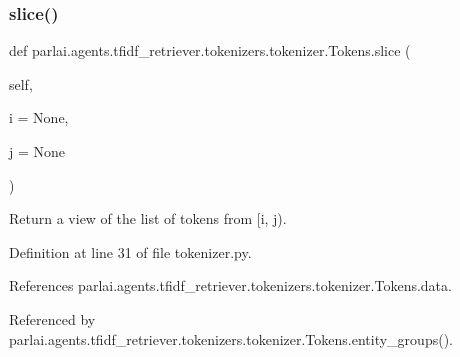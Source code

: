 \mbox{\label{classparlai_1_1agents_1_1tfidf__retriever_1_1tokenizers_1_1tokenizer_1_1Tokens_a8e68a443796116164126c7216f5963d3}} 
\subsubsection{\texorpdfstring{slice()}{slice()}}
{\footnotesize\ttfamily def parlai.\+agents.\+tfidf\+\_\+retriever.\+tokenizers.\+tokenizer.\+Tokens.\+slice (\begin{DoxyParamCaption}\item[{}]{self,  }\item[{}]{i = {\ttfamily None},  }\item[{}]{j = {\ttfamily None} }\end{DoxyParamCaption})}

\begin{DoxyVerb}Return a view of the list of tokens from [i, j).\end{DoxyVerb}
 

Definition at line 31 of file tokenizer.\+py.



References parlai.\+agents.\+tfidf\+\_\+retriever.\+tokenizers.\+tokenizer.\+Tokens.\+data.



Referenced by parlai.\+agents.\+tfidf\+\_\+retriever.\+tokenizers.\+tokenizer.\+Tokens.\+entity\+\_\+groups().

